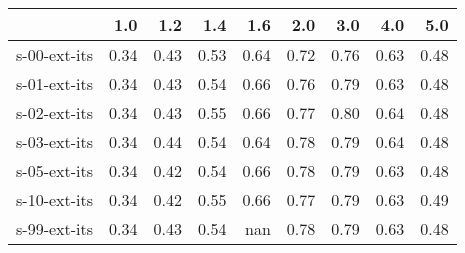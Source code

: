\begin{tabular}{lrrrrrrrr}
\toprule
{} &  1.0 &  1.2 &  1.4 &  1.6 &  2.0 &  3.0 &  4.0 &  5.0 \\
\midrule
s-00-ext-its & 0.34 & 0.43 & 0.53 & 0.64 & 0.72 & 0.76 & 0.63 & 0.48 \\
s-01-ext-its & 0.34 & 0.43 & 0.54 & 0.66 & 0.76 & 0.79 & 0.63 & 0.48 \\
s-02-ext-its & 0.34 & 0.43 & 0.55 & 0.66 & 0.77 & 0.80 & 0.64 & 0.48 \\
s-03-ext-its & 0.34 & 0.44 & 0.54 & 0.64 & 0.78 & 0.79 & 0.64 & 0.48 \\
s-05-ext-its & 0.34 & 0.42 & 0.54 & 0.66 & 0.78 & 0.79 & 0.63 & 0.48 \\
s-10-ext-its & 0.34 & 0.42 & 0.55 & 0.66 & 0.77 & 0.79 & 0.63 & 0.49 \\
s-99-ext-its & 0.34 & 0.43 & 0.54 &  nan & 0.78 & 0.79 & 0.63 & 0.48 \\
\bottomrule
\end{tabular}
